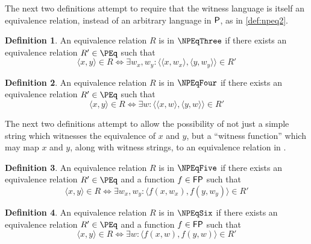 \documentclass[draft]{article}
\theoremstyle{definition} \newtheorem{openproblem}[openproblem]{Open problem}
\theoremstyle{definition} \newtheorem{definition}[definition]{Definition}
\theoremstyle{remark} \newtheorem{remark}[remark]{Remark}
\newcommand{\pair}[2]{\langle#1,#2\rangle} %
\begin{document}
The next two definitions attempt to require that the witness language is itself an equivalence relation, instead of an arbitrary language in $\P$, as in \autoref{def:npeq2}.
\begin{definition}\label{def:npeq3}
  An equivalence relation $R$ is in $\NPEqThree$ if there exists an equivalence relation $R'\in \PEq$ such that
  \begin{displaymath}
    \pair{x}{y}\in R\iff \exists w_x,w_y\colon \pair{\pair{x}{w_x}}{\pair{y}{w_y}}\in R'
  \end{displaymath}
\end{definition}
\begin{definition}\label{def:npeq4}
  An equivalence relation $R$ is in $\NPEqFour$ if there exists an equivalence relation $R'\in \PEq$ such that
  \begin{displaymath}
    \pair{x}{y}\in R\iff \exists w\colon \pair{\pair{x}{w}}{\pair{y}{w}}\in R'
  \end{displaymath}
\end{definition}

The next two definitions attempt to allow the possibility of not just a simple string which witnesses the equivalence of $x$ and $y$, but a ``witness function'' which may map $x$ and $y$, along with witness strings, to an equivalence relation in \PEq.
\begin{definition}\label{def:npeq5}
  An equivalence relation $R$ is in $\NPEqFive$ if there exists an equivalence relation $R'\in \PEq$ and a function $f\in\FP$ such that
  \begin{displaymath}
    \pair{x}{y}\in R\iff \exists w_x,w_y\colon \pair{f(x, w_x)}{f(y, w_y)}\in R'
  \end{displaymath}
\end{definition}
\begin{definition}\label{def:npeq6}
  An equivalence relation $R$ is in $\NPEqSix$ if there exists an equivalence relation $R'\in \PEq$ and a function $f\in\FP$ such that
  \begin{displaymath}
    \pair{x}{y}\in R\iff \exists w\colon \pair{f(x, w)}{f(y, w)}\in R'
  \end{displaymath}
\end{definition}
\end{document}
